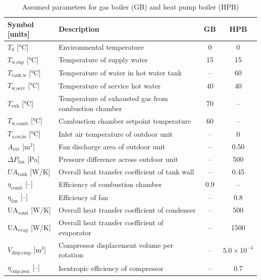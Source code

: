 \documentclass[final,5p,times,twocolumn,authoryear]{elsarticle}
\begin{document}
\begin{table}[t]
\centering
\caption{Assumed parameters for gas boiler (GB) and heat pump boiler (HPB)}
\label{tab:system_parameters}
\renewcommand{\arraystretch}{1.2}
\small
\begin{tabularx}{\columnwidth}{l X c c}
\toprule
\textbf{Symbol [units]} & \textbf{Description} & \textbf{GB} & \textbf{HPB} \\
\midrule
$T_0$ [°C] & Environmental temperature & 0 & 0 \\
$T_{\text{w,sup}}$ [°C] & Temperature of supply water & 15 & 15 \\
$T_{\text{tank,w}}$ [°C] & Temperature of water in hot water tank & -- & 60 \\
$T_{\text{w,serv}}$ [°C] & Temperature of service hot water & 40 & 40 \\
$T_{\text{exh}}$ [°C] & Temperature of exhausted gas from combustion chamber & 70 & -- \\
$T_{\text{w,comb}}$ [°C] & Combustion chamber setpoint temperature & 60 & -- \\
$T_{\text{a,ou,in}}$ [°C] & Inlet air temperature of outdoor unit & -- & 0 \\
$A_{\text{ext}}$ [m$^2$] & Fan discharge area of outdoor unit & -- & 0.50 \\
$\Delta P_{\text{fan}}$ [Pa] & Pressure difference across outdoor unit & -- & 500 \\
$UA_{\text{tank}}$ [W/K] & Overall heat transfer coefficient of tank wall & -- & 0.45 \\
$\eta_{\text{comb}}$ [--] & Efficiency of combustion chamber & 0.9 & -- \\
$\eta_{\text{fan}}$ [--] & Efficiency of fan & -- & 0.8 \\
$\text{UA}_{\text{cond}}$ [W/K] & Overall heat transfer coefficient of condenser & -- & 500 \\
$\text{UA}_{\text{evap}}$ [W/K] & Overall heat transfer coefficient of evaporator & -- & 1500 \\
$V_{\text{disp,cmp}}$ [m$^3$] & Compressor displacement volume per rotation& -- & $5.0 \times 10^{-4}$ \\
$\eta_{\text{cmp,isen}}$ [--] & Isentropic efficiency of compressor & -- & 0.7 \\
\bottomrule
\end{tabularx}
\end{table}
\end{document}
